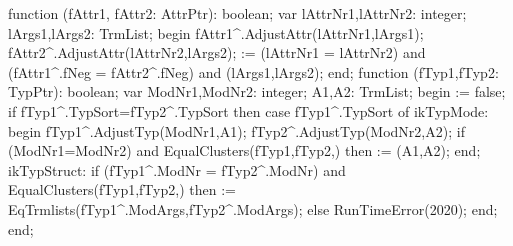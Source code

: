 \nwenddocs{}\endmoddef\nwstartdeflinemarkup\nwenddeflinemarkup
function (fAttr1, fAttr2: AttrPtr): boolean;
var
   lAttrNr1,lAttrNr2: integer;
   lArgs1,lArgs2: TrmList;
begin
   fAttr1^.AdjustAttr(lAttrNr1,lArgs1);
   fAttr2^.AdjustAttr(lAttrNr2,lArgs2);
    := (lAttrNr1 = lAttrNr2) and
      (fAttr1^.fNeg = fAttr2^.fNeg) and
      (lArgs1,lArgs2);
end;
\eatline
{}\nwendcode{}\nwdocspar
\nwenddocs{}\endmoddef\nwstartdeflinemarkup\nwenddeflinemarkup
function (fTyp1,fTyp2: TypPtr): boolean;
var
   ModNr1,ModNr2: integer;
   A1,A2: TrmList;
begin
    := false;
   if fTyp1^.TypSort=fTyp2^.TypSort then
      case fTyp1^.TypSort of
         ikTypMode:
            begin
               fTyp1^.AdjustTyp(ModNr1,A1);
               fTyp2^.AdjustTyp(ModNr2,A2);
               if (ModNr1=ModNr2) and EqualClusters(fTyp1,fTyp2,) then
                   := (A1,A2);
            end;
         ikTypStruct:
            if (fTyp1^.ModNr = fTyp2^.ModNr) and
                  EqualClusters(fTyp1,fTyp2,) then
                := EqTrmlists(fTyp1^.ModArgs,fTyp2^.ModArgs);
      else RunTimeError(2020);
      end;
end;
\eatline
